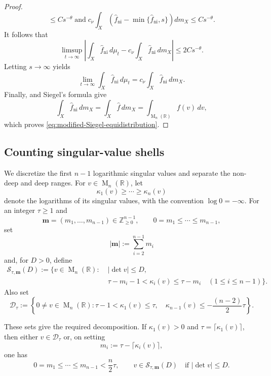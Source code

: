 \documentclass[reqno,11pt]{amsart}
\numberwithin{equation}{section}
\theoremstyle{definition}
\theoremstyle{remark}
\newcommand{\op}{\operatorname}
\newcommand{\R}{\mathbb R}
\newcommand{\br}{\mathbb R}
\newcommand{\M}{\op{M}}
\begin{document}
\begin{proof}
$$\le Cs^{-\theta}\;\text{and}\;
c_\nu\int_X
\left(
\widehat f_{\operatorname{ni}}
-\min\{\widehat f_{\operatorname{ni}},s\}
\right)dm_X
\le Cs^{-\theta}.
$$
It follows that
$$
\limsup_{t\to\infty}
\left|
\int_X\widehat f_{\operatorname{ni}}\,d\mu_t
-
c_\nu\int_X\widehat f_{\operatorname{ni}}\,dm_X
\right|
\le2Cs^{-\theta}.
$$
Letting $s\to\infty$ yields
$$
\lim_{t\to\infty}
\int_X\widehat f_{\operatorname{ni}}\,d\mu_t
=
c_\nu\int_X\widehat f_{\operatorname{ni}}\,dm_X.
$$
Finally,  and Siegel's formula
give
$$
\int_X\widehat f_{\operatorname{ni}}\,dm_X
=
\int_X\widehat f\,dm_X
=
\int_{\M_n(\R)}f(v)\,dv,
$$
which proves \eqref{eq:modified-Siegel-equidistribution}.
\end{proof}


\subsection{Counting singular-value shells}
\label{subsec:singular-value-shells}
We discretize the first $n-1$ logarithmic singular values and separate
the non-deep and deep ranges. 
For $v\in \M_n(\br)$, let
$$
\kappa_1(v)\ge\cdots\ge\kappa_n(v)
$$
denote the logarithms of its singular values, with the convention
$\log 0=-\infty$.
For an integer $\tau\ge1$ and
$$
\mathbf m=(m_1,\ldots,m_{n-1})\in\mathbb Z_{\ge0}^{n-1},
\qquad
0=m_1\le\cdots\le m_{n-1},
$$
set
$$
|\mathbf m|:=\sum_{i=2}^{n-1}m_i
$$
and, for $D>0$, define
\begin{equation}\label{eq:integer-shell-definition}
\begin{aligned}
\mathcal S_{\tau,\mathbf m}(D)
:=\bigl\{v\in\M_n(\R):\;&|\det v|\le D,\\
&\tau-m_i-1<\kappa_i(v)\le\tau-m_i
\quad(1\le i\le n-1)\bigr\}.
\end{aligned}
\end{equation}
Also set
\begin{equation}\label{eq:deep-shell-set}
\mathcal D_\tau
:=
\left\{0\ne v\in\M_n(\R):
\tau-1<\kappa_1(v)\le\tau,\quad
\kappa_{n-1}(v)\le-\frac{(n-2)}{2}\tau
\right\}.
\end{equation}

These sets give the required decomposition. If $\kappa_1(v)>0$ and
$\tau=\lceil\kappa_1(v)\rceil$, then either $v\in\mathcal D_\tau$ or,
on setting
$$
m_i:=\tau-\lceil\kappa_i(v)\rceil,
$$
one has
\begin{equation}\label{eq:non-deep-deficits}
0=m_1\le\cdots\le m_{n-1}<\frac n2\tau,
\qquad
v\in\mathcal S_{\tau,\mathbf m}(D)
\quad\text{if }|\det v|\le D.
\end{equation}
\end{document}
